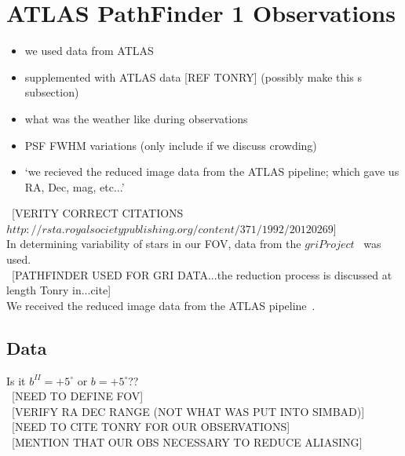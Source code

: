 \documentclass[aps,prl,twocolumn,superscriptaddress]{revtex4-1}
\begin{document}
\section{ATLAS PathFinder 1 Observations}
\begin{itemize}
	\item{} we used data from ATLAS
	\item{} supplemented with ATLAS data [REF TONRY] (possibly make this s subsection)
	\item{} what was the weather like during observations
	\item{} PSF FWHM variations (only include if we discuss crowding)
	\item{} `we recieved the reduced image data from the ATLAS pipeline; which gave us RA, Dec, mag, etc...'
\end{itemize}


~[VERITY CORRECT CITATIONS $http://rsta.royalsocietypublishing.org/content/371/1992/20120269$]\\
In determining variability of stars in our FOV, data from the $gri Project$~\cite{gri} was used.\\
~[PATHFINDER USED FOR GRI DATA...the reduction process is discussed at length Tonry in...cite]\\
We received the reduced image data from the ATLAS pipeline~\cite{PSimgpipe,tonrypipe}.



\subsection{Data}



Is it $b^{II}=+5^{\circ}$ or $b=+5^{\circ}$??\\
~[NEED TO DEFINE FOV]\\
~[VERIFY RA DEC RANGE (NOT WHAT WAS PUT INTO SIMBAD)]\\
~[NEED TO CITE TONRY FOR OUR OBSERVATIONS]\\
~[MENTION THAT OUR OBS NECESSARY TO REDUCE ALIASING]\\
\end{document}
